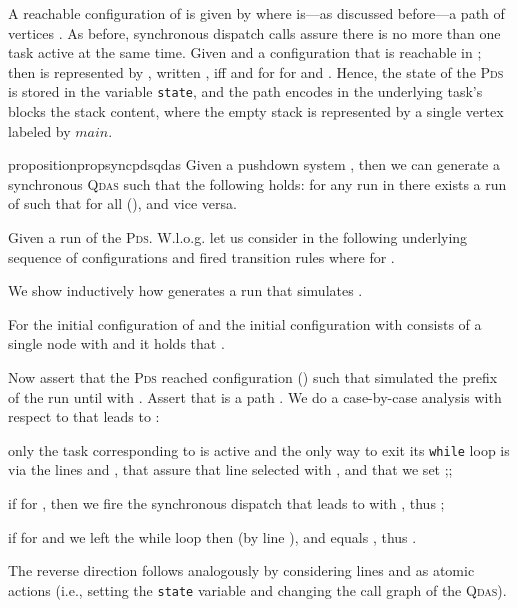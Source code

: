 \documentclass[runningheads,oribibl,]{article}
\newcommand{\main}{\ensuremath{\textit{main}}\xspace}
\newcommand{\pds}{\textsc{Pds}\xspace}
\newcommand{\qdas}{\textsc{Qdas}\xspace}
\newenvironment{myitemize}{\begin{list}{\labelitemi}{\setlength{\topsep}{4pt}\setlength{\partopsep}{0pt}
\setlength{\itemsep}{0pt}
\setlength{\itemindent}{0ex}
\setlength{\listparindent}{0ex}
\setlength{\leftmargin}{4ex}\setlength{\labelwidth}{2ex}
}}
{\end{list}}
\newenvironment{proof}{\noindent{\it Proof.\hspace*{.5cm}}}{}
\begin{document}
A reachable configuration of 
is given by  where  is---as discussed before---a
path of vertices . As before, synchronous dispatch calls assure
there is no more than one task
active at the same time. Given 
and a configuration  that is reachable in ; then
 is represented by , written , iff
 and for 
 for  and . Hence, the state
of the \pds is stored in the variable \texttt{state}, and the path 
encodes in the underlying task's blocks the stack content, where the empty stack
is represented by a single vertex labeled by \main.

\begin{restatable}{proposition}{propsyncpdsqdas}
\label{prop:sync_pds_qdas}  Given a pushdown system , then we can generate  a
  synchronous \qdas  such that the following holds:
  for any
  run  in  there exists a
  run  of  such that
  for all 
  (),
  and vice versa.
\end{restatable}
\begin{proof}
  Given a run  of the \pds .
  W.l.o.g. let us consider in the following underlying sequence
  of configurations and fired transition rules
   where
   for .

  We show inductively how  generates a run that
  simulates .

  For the initial configuration of  
  and the initial configuration 
  with  consists of a single node  with
   and  it holds
  that .

  Now assert that the \pds  reached configuration  ()
  such that  simulated the prefix of the run until
   with
  . Assert that  is a path .
  We do a case-by-case analysis with respect
  to  that leads to :
  \begin{myitemize}
    \item only the task corresponding to  is active and
      the only way to exit its \texttt{while} loop is
      via the lines  and , that assure that line  selected
       with , and that we
      set ;;
    \item if  for , then
      we fire the synchronous dispatch that leads to  with , thus
      ;
    \item if  for  and we left the
      while loop then   (by line ), and
       equals , thus
      .
  \end{myitemize}

  The reverse direction follows analogously by considering lines 
  and  as atomic actions (i.e., setting the \texttt{state} variable
  and changing the call graph of the \qdas).
\end{proof}
\end{document}
